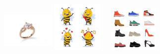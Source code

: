 \includegraphics[width=1.00972in,height=0.84375in]{media/image119.jpg}
%
\includegraphics[width=0.96875in,height=0.99167in]{media/image120.jpg}
%
\includegraphics[width=1.30694in,height=0.88542in]{media/image121.jpg}
%
%
%
%
%
%
%
%
%


